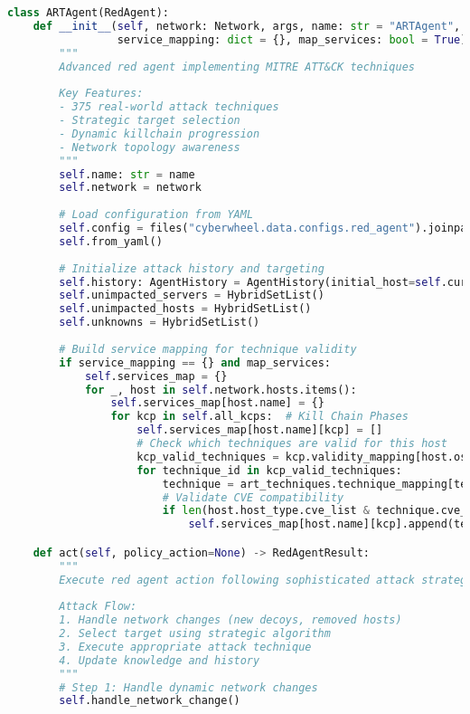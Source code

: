 \documentclass[12pt,a4paper]{article}
\begin{document}
\begin{lstlisting}[language=Python, caption=ART Agent Core Implementation]
class ARTAgent(RedAgent):
    def __init__(self, network: Network, args, name: str = "ARTAgent", 
                 service_mapping: dict = {}, map_services: bool = True):
        """
        Advanced red agent implementing MITRE ATT&CK techniques
        
        Key Features:
        - 375 real-world attack techniques
        - Strategic target selection
        - Dynamic killchain progression
        - Network topology awareness
        """
        self.name: str = name
        self.network = network
        
        # Load configuration from YAML
        self.config = files("cyberwheel.data.configs.red_agent").joinpath(args.red_agent)
        self.from_yaml()
        
        # Initialize attack history and targeting
        self.history: AgentHistory = AgentHistory(initial_host=self.current_host)
        self.unimpacted_servers = HybridSetList()
        self.unimpacted_hosts = HybridSetList()
        self.unknowns = HybridSetList()
        
        # Build service mapping for technique validity
        if service_mapping == {} and map_services:
            self.services_map = {}
            for _, host in self.network.hosts.items():
                self.services_map[host.name] = {}
                for kcp in self.all_kcps:  # Kill Chain Phases
                    self.services_map[host.name][kcp] = []
                    # Check which techniques are valid for this host
                    kcp_valid_techniques = kcp.validity_mapping[host.os][kcp.get_name()]
                    for technique_id in kcp_valid_techniques:
                        technique = art_techniques.technique_mapping[technique_id]
                        # Validate CVE compatibility
                        if len(host.host_type.cve_list & technique.cve_list) > 0:
                            self.services_map[host.name][kcp].append(technique_id)

    def act(self, policy_action=None) -> RedAgentResult:
        """
        Execute red agent action following sophisticated attack strategy
        
        Attack Flow:
        1. Handle network changes (new decoys, removed hosts)
        2. Select target using strategic algorithm
        3. Execute appropriate attack technique
        4. Update knowledge and history
        """
        # Step 1: Handle dynamic network changes
        self.handle_network_change()
        

\end{lstlisting}
\end{document}
